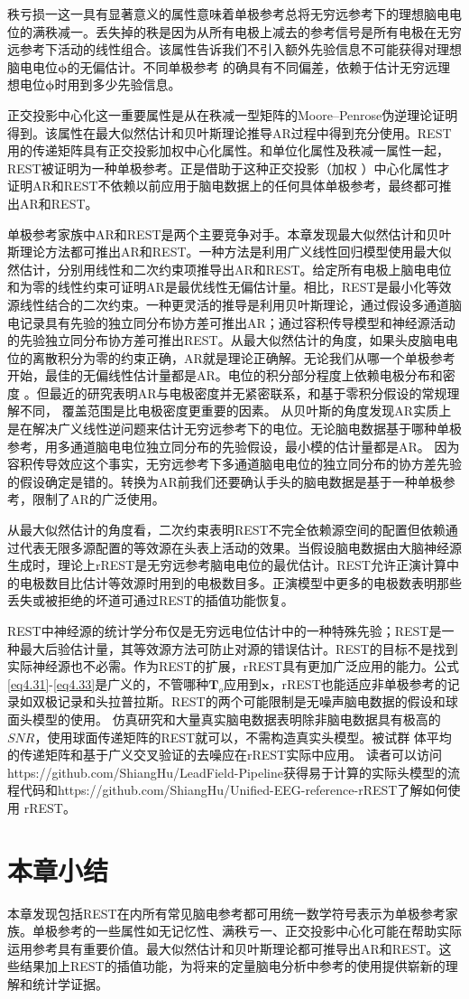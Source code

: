 秩亏损一这一具有显著意义的属性意味着单极参考总将无穷远参考下的理想脑电电位的满秩减一。丢失掉的秩是因为从所有电极上减去的参考信号是所有电极在无穷远参考下活动的线性组合。该属性告诉我们不引入额外先验信息不可能获得对理想脑电电位$\mathbf{\phi}$的无偏估计。不同单极参考
的确具有不同偏差，依赖于估计无穷远理想电位$\mathbf{\phi}$时用到多少先验信息。

正交投影中心化这一重要属性是从在秩减一型矩阵的Moore–Penrose伪逆理论证明得到。该属性在最大似然估计和贝叶斯理论推导AR过程中得到充分使用。REST用的传递矩阵具有正交投影加权中心化属性。和单位化属性及秩减一属性一起，REST被证明为一种单极参考。正是借助于这种正交投影（加权
）中心化属性才证明AR和REST不依赖以前应用于脑电数据上的任何具体单极参考，最终都可推出AR和REST。

单极参考家族中AR和REST是两个主要竞争对手。本章发现最大似然估计和贝叶斯理论方法都可推出AR和REST。一种方法是利用广义线性回归模型使用最大似然估计，分别用线性和二次约束项推导出AR和REST。给定所有电极上脑电电位和为零的线性约束可证明AR是最优线性无偏估计量。相比，REST是最小化等效源线性结合的二次约束。一种更灵活的推导是利用贝叶斯理论，通过假设多通道脑电记录具有先验的独立同分布协方差可推出AR；通过容积传导模型和神经源活动的先验独立同分布协方差可推出REST。从最大似然估计的角度，如果头皮脑电电位的离散积分为零的约束正确，AR就是理论正确解。无论我们从哪一个单极参考开始，最佳的无偏线性估计量都是AR。电位的积分部分程度上依赖电极分布和密度
。但最近的研究表明AR与电极密度并无紧密联系，和基于零积分假设的常规理解不同，
覆盖范围是比电极密度更重要的因素。 从贝叶斯的角度发现AR实质上是在解决广义线性逆问题来估计无穷远参考下的电位。无论脑电数据基于哪种单极参考，用多通道脑电电位独立同分布的先验假设，最小模的估计量都是AR。 因为容积传导效应这个事实，无穷远参考下多通道脑电电位的独立同分布的协方差先验的假设确定是错的。转换为AR前我们还要确认手头的脑电数据是基于一种单极参考，限制了AR的广泛使用。

从最大似然估计的角度看，二次约束表明REST不完全依赖源空间的配置但依赖通过代表无限多源配置的等效源在头表上活动的效果。当假设脑电数据由大脑神经源生成时，理论上rREST是无穷远参考脑电电位的最优估计。REST允许正演计算中的电极数目比估计等效源时用到的电极数目多。正演模型中更多的电极数表明那些丢失或被拒绝的坏道可通过REST的插值功能恢复。

REST中神经源的统计学分布仅是无穷远电位估计中的一种特殊先验；REST是一种最大后验估计量，其等效源方法可防止对源的错误估计。REST的目标不是找到实际神经源也不必需。作为REST的扩展，rREST具有更加广泛应用的能力。公式 \eqref{eq4.31}-\eqref{eq4.33}是广义的，不管哪种$\mathbf{T}_o$应用到$\mathbf{x}$，rREST也能适应非单极参考的记录如双极记录和头拉普拉斯。REST的两个可能限制是无噪声脑电数据的假设和球
面头模型的使用。 仿真研究和大量真实脑电数据表明除非脑电数据具有极高的$SNR$，使用球面传递矩阵的REST就可以，不需构造真实头模型。被试群
体平均的传递矩阵和基于广义交叉验证的去噪应在rREST实际中应用。 读者可以访问https://github.com/ShiangHu/LeadField-Pipeline获得易于计算的实际头模型的流程代码和https://github.com/ShiangHu/Unified-EEG-reference-rREST了解如何使用
rREST。
\section{本章小结}
本章发现包括REST在内所有常见脑电参考都可用统一数学符号表示为单极参考家族。单极参考的一些属性如无记忆性、满秩亏一、正交投影中心化可能在帮助实际运用参考具有重要价值。最大似然估计和贝叶斯理论都可推导出AR和REST。这些结果加上REST的插值功能，为将来的定量脑电分析中参考的使用提供崭新的理解和统计学证据。